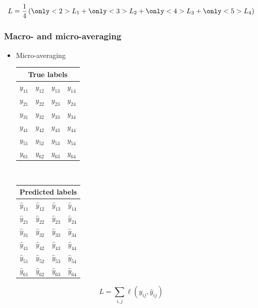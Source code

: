 \documentclass[]{beamer}
\begin{document}
\begin{frame}
$$
L = \frac{1}{4} \left( {\only<2>{\color{putred}}L_1} + {\only<3>{\color{putred}}L_2} + {\only<4>{\color{putred}}L_3} + {\only<5>{\color{putred}}L_4} \right)
$$

\end{frame}



\begin{frame}
\frametitle{Macro- and micro-averaging}

\begin{itemize}
\item<1-> Micro-averaging

\begin{center}
\begin{tabular}{|c|c|c|c|}
\multicolumn{4}{c}{True labels} \\
\hline
\color{putred}$y_{11}$ & \color{putred}$y_{12}$ & \color{putred}$y_{13}$ & \color{putred}$y_{14}$ \\
\color{putred}$y_{21}$ & \color{putred}$y_{22}$ & \color{putred}$y_{23}$ & \color{putred}$y_{24}$ \\
\color{putred}$y_{31}$ & \color{putred}$y_{32}$ & \color{putred}$y_{33}$ & \color{putred}$y_{34}$ \\
\color{putred}$y_{41}$ & \color{putred}$y_{42}$ & \color{putred}$y_{43}$ & \color{putred}$y_{44}$ \\
\color{putred}$y_{51}$ & \color{putred}$y_{52}$ & \color{putred}$y_{53}$ & \color{putred}$y_{54}$ \\
\color{putred}$y_{61}$ & \color{putred}$y_{62}$ & \color{putred}$y_{63}$ & \color{putred}$y_{64}$ \\
\hline
\end{tabular}
$\quad$
\begin{tabular}{|c|c|c|c|}
\multicolumn{4}{c}{Predicted labels} \\
\hline
\color{putred}$\hat{y}_{11}$ & \color{putred}$\hat{y}_{12}$ & \color{putred}$\hat{y}_{13}$ & \color{putred}$\hat{y}_{14}$ \\
\color{putred}$\hat{y}_{21}$ & \color{putred}$\hat{y}_{22}$ & \color{putred}$\hat{y}_{23}$ & \color{putred}$\hat{y}_{24}$ \\
\color{putred}$\hat{y}_{31}$ & \color{putred}$\hat{y}_{32}$ & \color{putred}$\hat{y}_{33}$ & \color{putred}$\hat{y}_{34}$ \\
\color{putred}$\hat{y}_{41}$ & \color{putred}$\hat{y}_{42}$ & \color{putred}$\hat{y}_{43}$ & \color{putred}$\hat{y}_{44}$ \\
\color{putred}$\hat{y}_{51}$ & \color{putred}$\hat{y}_{52}$ & \color{putred}$\hat{y}_{53}$ & \color{putred}$\hat{y}_{54}$ \\
\color{putred}$\hat{y}_{61}$ & \color{putred}$\hat{y}_{62}$ & \color{putred}$\hat{y}_{63}$ & \color{putred}$\hat{y}_{64}$ \\
\hline
\end{tabular}
\end{center}
\end{itemize}

$$
L =  \sum_{i,j} \ell(y_{ij} , \hat{y}_{ij})
$$

\end{frame}
\end{document}
